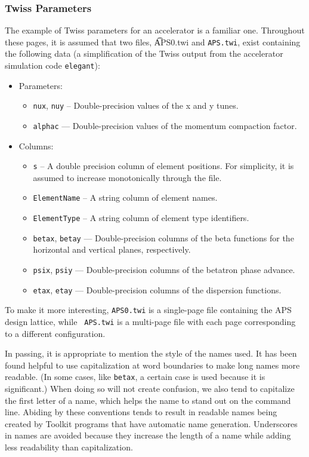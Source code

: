 \documentclass[11pt]{article}
\begin{document}
\subsubsection{Twiss Parameters}

The example of Twiss parameters for an accelerator is a familiar one.  Throughout these pages, it is assumed that two
files, {\t APS0.twi} and {\tt APS.twi}, exist containing the following data (a simplification of the Twiss output from the
accelerator simulation code \verb|elegant|):
\begin{itemize}
\item Parameters: 
        \begin{itemize} 
        \item {\tt nux}, {\tt nuy} -- Double-precision values of the x and y tunes.
        \item {\tt alphac} --- Double-precision values of the momentum compaction factor.
        \end{itemize}
\item Columns:
        \begin{itemize}
        \item {\tt s} -- A double precision column of element positions.  For simplicity, it is assumed to increase
                monotonically through the file.
        \item {\tt ElementName} -- A string column of element names.
        \item {\tt ElementType} -- A string column of element type identifiers.
        \item {\tt betax}, {\tt betay} --- Double-precision columns of the beta functions for the
        horizontal and vertical planes, respectively.
        \item {\tt psix}, {\tt psiy} --- Double-precision columns of the betatron phase advance.
        \item {\tt etax}, {\tt etay} --- Double-precision columns of the dispersion functions.
        \end{itemize}
\end{itemize}
To make it more interesting, {\tt APS0.twi} is a single-page file containing the APS design lattice, while {\tt
APS.twi} is a multi-page file with each page corresponding to a different configuration.

In passing, it is appropriate to mention the style of the names used.  It has been found helpful to use capitalization
at word boundaries to make long names more readable.  (In some cases, like {\tt betax}, a certain case is used because
it is significant.)  When doing so will not create confusion, we also tend to capitalize the first letter of a name,
which helps the name to stand out on the command line.  Abiding by these conventions tends to result in readable names
being created by Toolkit programs that have automatic name generation.  Underscores in names are avoided because they
increase the length of a name while adding less readability than capitalization.
\end{document}
